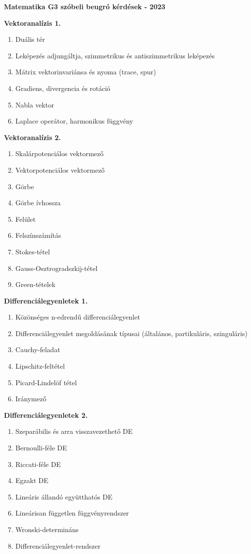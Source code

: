 \documentclass[11pt,a4paper]{article}
\begin{document}
\newpage
\begin{center}
    \Large \textbf{Matematika G3 szóbeli beugró kérdések - 2023}
 \end{center}
 \textbf{Vektoranalízis 1.}
 \begin{enumerate}
    \item Duális tér
    \item Leképezés adjungáltja, szimmetrikus és antiszimmetrikus leképezés
    \item Mátrix vektorinvariánsa és nyoma (trace, spur)
    \item Gradiens, divergencia és rotáció
    \item Nabla vektor
    \item Laplace operátor, harmonikus függvény
 \end{enumerate}
 \textbf{Vektoranalízis 2.}
 \begin{enumerate}
    \item Skalárpotenciálos vektormező
    \item Vektorpotenciálos vektormező
    \item Görbe
    \item Görbe ívhossza
    \item Felület
    \item Felszínszámítás
    \item Stokes-tétel
    \item Gauss-Osztrogradszkij-tétel
    \item Green-tételek
 \end{enumerate}
 \textbf{Differenciálegyenletek 1.}
 \begin{enumerate}
    \item Közönséges n-edrendű differenciálegyenlet
    \item Differenciálegyenlet megoldásának típusai (általános, partikuláris, szinguláris)
    \item Cauchy-feladat
    \item Lipschitz-feltétel
    \item Picard-Lindelöf tétel
    \item Iránymező
 \end{enumerate}
 \textbf{Differenciálegyenletek 2.}
 \begin{enumerate}
    \item Szeparábilis és arra visszavezethető DE
    \item Bernoulli-féle DE
    \item Riccati-féle DE
    \item Egzakt DE
    \item Lineáris állandó együtthatós DE
    \item Lineárisan független függvényrendszer
    \item Wronski-determináns
    \item Differenciálegyenlet-rendszer
 \end{enumerate}

 
\end{document}
